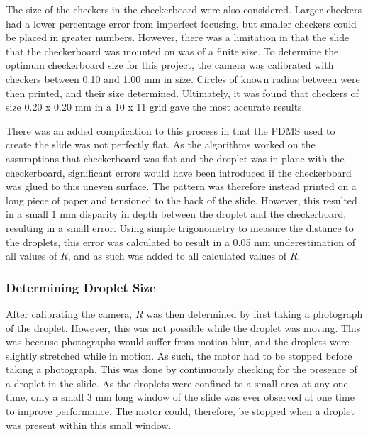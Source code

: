 \documentclass{physics_article_B}
\begin{document}
            The size of the checkers in the checkerboard were also considered. Larger checkers had a lower percentage error from imperfect focusing, but smaller checkers could be placed in greater numbers. However, there was a limitation in that the slide that the checkerboard was mounted on was of a finite size. To determine the optimum checkerboard size for this project, the camera was calibrated with checkers between 0.10 and 1.00 mm in size. Circles of known radius between were then printed, and their size determined. Ultimately, it was found that checkers of size 0.20 x 0.20 mm in a 10 x 11 grid gave the most accurate results. 
            
            There was an added complication to this process in that the PDMS used to create the slide was not perfectly flat. As the algorithms worked on the assumptions that checkerboard was flat and the droplet was in plane with the checkerboard, significant errors would have been introduced if the checkerboard was glued to this uneven surface. The pattern was therefore instead printed on a long piece of paper and tensioned to the back of the slide. However, this resulted in a small 1 mm disparity in depth between the droplet and the checkerboard, resulting in a small error. Using simple trigonometry to measure the distance to the droplets, this error was calculated to result in a 0.05 mm underestimation of all values of $R$, and as such was added to all calculated values of $R$. 
        
        \subsubsection{Determining Droplet Size\label{sect:method:vision:size}}
                
            After calibrating the camera, $R$ was then determined by first taking a photograph of the droplet. However, this was not possible while the droplet was moving. This was because photographs would suffer from motion blur, and the droplets were slightly stretched while in motion. As such, the motor had to be stopped before taking a photograph. This was done by continuously checking for the presence of a droplet in the slide. As the droplets were confined to a small area at any one time, only a small 3 mm long window of the slide was ever observed at one time to improve performance. The motor could, therefore, be stopped when a droplet was present within this small window.    
                
\end{document}
